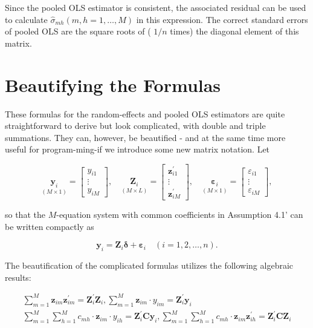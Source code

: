 \documentclass[10pt]{article}
\begin{document}
Since the pooled OLS estimator is consistent, the associated residual can be used to calculate $\hat{\sigma}_{m h}(m, h=1, \ldots, M)$ in this expression. The correct standard errors of pooled OLS are the square roots of ( $1 / n$ times) the diagonal element of this matrix.

\section*{Beautifying the Formulas}
These formulas for the random-effects and pooled OLS estimators are quite straightforward to derive but look complicated, with double and triple summations. They can, however, be beautified - and at the same time more useful for program-ming-if we introduce some new matrix notation. Let

\[
\underset{(M \times 1)}{\mathbf{y}_{i}}=\left[\begin{array}{c}
y_{i 1}  \tag{4.6.15}\\
\vdots \\
y_{i M}
\end{array}\right], \quad \underset{(M \times L)}{\mathbf{Z}_{i}}=\left[\begin{array}{c}
\mathbf{z}_{i 1}^{\prime} \\
\vdots \\
\mathbf{z}_{i M}^{\prime}
\end{array}\right], \quad \underset{(M \times 1)}{\boldsymbol{\varepsilon}_{i}}=\left[\begin{array}{c}
\varepsilon_{i 1} \\
\vdots \\
\varepsilon_{i M}
\end{array}\right],
\]

so that the $M$-equation system with common coefficients in Assumption 4.1' can be written compactly as


\begin{equation*}
\mathbf{y}_{i}=\mathbf{Z}_{i} \boldsymbol{\delta}+\boldsymbol{\varepsilon}_{i} \quad(i=1,2, \ldots, n) . \tag{$\prime$}
\end{equation*}


The beautification of the complicated formulas utilizes the following algebraic results:


\begin{gather*}
\sum_{m=1}^{M} \mathbf{z}_{i m} \mathbf{z}_{i m}^{\prime}=\mathbf{Z}_{i}^{\prime} \mathbf{Z}_{i}, \sum_{m=1}^{M} \mathbf{z}_{i m} \cdot y_{i m}=\mathbf{Z}_{i}^{\prime} \mathbf{y}_{i}  \tag{4.6.16a}\\
\sum_{m=1}^{M} \sum_{h=1}^{M} c_{m h} \cdot \mathbf{z}_{i m} \cdot y_{i h}=\mathbf{Z}_{i}^{\prime} \mathbf{C} \mathbf{y}_{i}, \sum_{m=1}^{M} \sum_{h=1}^{M} c_{m h} \cdot \mathbf{z}_{i m} \mathbf{z}_{i h}^{\prime}=\mathbf{Z}_{i}^{\prime} \mathbf{C} \mathbf{Z}_{i} \tag{4.6.16b}
\end{gather*}
\end{document}
